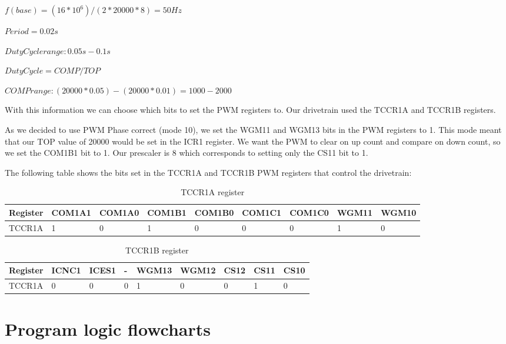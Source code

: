 \documentclass[12pt, a4paper]{article}
\begin{document}
    $f(base) = (16*10^6) / (2*20000*8) = 50Hz$
    
    $Period = 0.02s$

    $Duty Cycle range: 0.05s - 0.1s$

    $Duty Cycle = COMP/TOP$

    $COMP range: (20000*0.05)-(20000*0.01) = 1000-2000$

    With this information we can choose which bits to set the PWM registers to. Our drivetrain used the TCCR1A and TCCR1B registers.

    As we decided to use PWM Phase correct (mode 10), we set the WGM11 and WGM13 bits in the PWM registers to 1. This mode meant that our TOP value of 20000 would be set in the ICR1 register.
    We want the PWM to clear on up count and compare on down count, so we set the COM1B1 bit to 1.
    Our prescaler is 8 which corresponds to setting only the CS11 bit to 1.

    The following table shows the bits set in the TCCR1A and TCCR1B PWM registers that control the drivetrain:
  \begin{table}[h]
    \centering
    \begin{tabular}{l|l|l|l|l|l|l|l|l}
      Register & COM1A1 & COM1A0 & COM1B1 & COM1B0 & COM1C1 & COM1C0 & WGM11 & WGM10 \\ \hline \hline
      TCCR1A & 1 & 0 & 1 & 0 & 0 & 0 & 1 & 0 \\ \hline                        
    \end{tabular}
    \caption{TCCR1A register}
    \label{tab:nome}
  \end{table}

  \begin{table}[h]
    \centering
    \begin{tabular}{l|l|l|l|l|l|l|l|l}
      Register & ICNC1 & ICES1 & - & WGM13 & WGM12 & CS12 & CS11 & CS10 \\ \hline \hline
      TCCR1A & 0 & 0 & 0 & 1 & 0 & 0 & 1 & 0 \\ \hline                        
    \end{tabular}
    \caption{TCCR1B register}
    \label{tab:nome}
  \end{table}

  \newpage

  \section{Program logic flowcharts} \label{sec:Flowchart}
\end{document}
